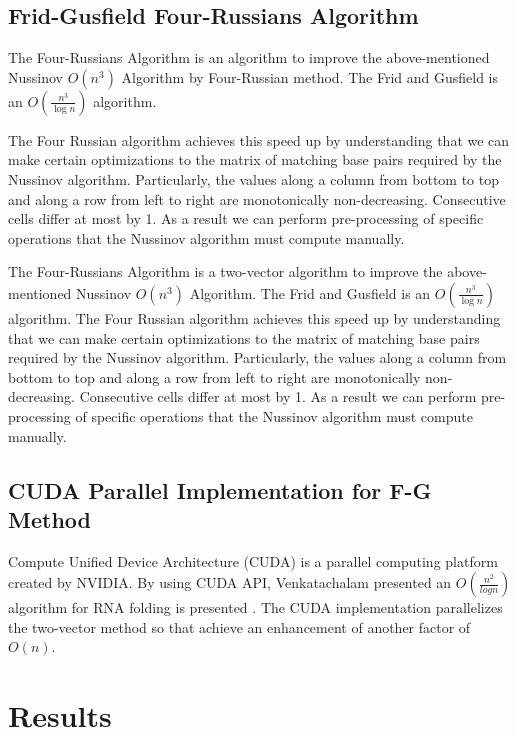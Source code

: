 \documentclass[12pt]{article}
\begin{document}
\subsection{Frid-Gusfield Four-Russians Algorithm}
\par The Four-Russians Algorithm \cite{gusfield} is an algorithm to improve the above-mentioned Nussinov $O(n^3)$ Algorithm by Four-Russian method. The Frid and Gusfield is an $O(\frac{n^3}{\log n})$ algorithm.
\par The Four Russian algorithm achieves this speed up by understanding that we can make certain optimizations to the matrix of matching base pairs required by the Nussinov algorithm. Particularly, the values along a column from bottom to top and along a row from left to right are monotonically non-decreasing. Consecutive cells differ at most by 1\cite{gusfield}. As a result we can perform pre-processing of specific operations that the Nussinov algorithm must compute manually.

\par The Four-Russians Algorithm \cite{gusfield} is a two-vector algorithm to
improve the above-mentioned Nussinov $O(n^3)$ Algorithm. The Frid and Gusfield
is an $O(\frac{n^3}{\log n})$ algorithm. The Four Russian algorithm achieves
this speed up by understanding that we can make certain optimizations to the
matrix of matching base pairs required by the Nussinov algorithm. Particularly,
the values along a column from bottom to top and along a row from left to right
are monotonically non-decreasing. Consecutive cells differ at most by 1\cite{gusfield}.
As a result we can perform pre-processing of specific operations that the
Nussinov algorithm must compute manually.

\subsection{CUDA Parallel Implementation for F-G Method}
\par Compute Unified Device Architecture (CUDA) is a parallel computing platform created by NVIDIA. By using CUDA API, Venkatachalam presented an $O(\frac{n^2}{logn})$ algorithm for RNA folding is presented \cite{balaji}. The CUDA implementation parallelizes the two-vector method so that achieve an enhancement of another factor of $O(n)$.

\section{Results}
\end{document}
